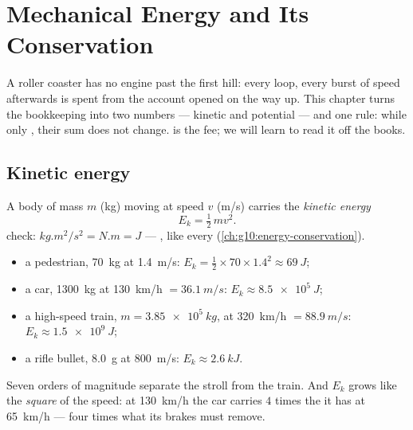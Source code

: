 \chapter{Mechanical Energy and Its Conservation}\label{ch:g11:mechanical-energy}

A roller coaster has no engine past the first hill: every loop, every
burst of speed afterwards is spent from the account opened on the way up.
This chapter turns the bookkeeping into two numbers --- kinetic and
potential  --- and one rule: while only  , their sum
does not change.  is the fee; we will learn to read it off the
books.

\section{Kinetic energy}

\begin{definition}\label{def:g11:mechanical-energy:kinetic}
A body of mass $m$ (\unit{kg}) moving at speed $v$ (\unit{m/s}) carries
the \emph{kinetic energy}
\[
E_k = \tfrac12\, m v^2 .
\]
 check: $\unit{kg.m^2/s^2} = \unit{N.m} = \unit{J}$ --- ,
like every  (\cref{ch:g10:energy-conservation}).
\end{definition}

\begin{example}\label{ex:g11:mechanical-energy:orders}
\begin{itemize}
  \item a pedestrian, \qty{70}{kg} at \qty{1.4}{m/s}:
        $E_k = \tfrac12 \times 70 \times 1.4^2 \approx \qty{69}{J}$;
  \item a car, \qty{1300}{kg} at \qty{130}{km/h} $= \qty{36.1}{m/s}$:
        $E_k \approx \qty{8.5e5}{J}$;
  \item a high-speed train, $m = \qty{3.85e5}{kg}$, at \qty{320}{km/h}
        $= \qty{88.9}{m/s}$: $E_k \approx \qty{1.5e9}{J}$;
  \item a rifle bullet, \qty{8.0}{g} at \qty{800}{m/s}: $E_k \approx \qty{2.6}{kJ}$.
\end{itemize}
Seven orders of magnitude separate the stroll from the train. And $E_k$
grows like the \emph{square} of the speed: at \qty{130}{km/h} the car
carries $4$ times the  it has at \qty{65}{km/h} --- four times
what its brakes must remove.
\end{example}

